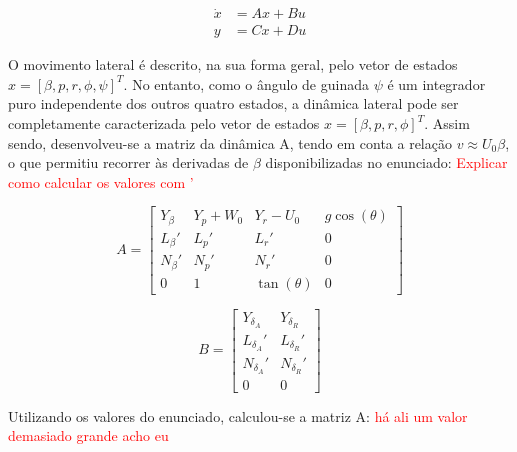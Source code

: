 \begin{align}
\dot{x} &= A x + B u \\
y &= C x + D u
\end{align}

\par O movimento lateral é descrito, na sua forma geral, pelo vetor de estados $x = [\beta, p, r, \phi, \psi]^T$. No entanto, como o ângulo de guinada $\psi$ é um integrador puro independente dos outros quatro estados, a dinâmica lateral pode ser completamente caracterizada pelo vetor de estados $x = [\beta, p, r, \phi]^T$. Assim sendo, desenvolveu-se a matriz da dinâmica A, tendo em conta a relação $v \approx U_0 \beta$, o que permitiu recorrer às derivadas de $\beta$ disponibilizadas no enunciado: \textcolor{red}{Explicar como calcular os valores com '}

\begin{equation}
A = \begin{bmatrix} Y_\beta & Y_p + W_0 & Y_r-U_0 & g\cos(\theta) \\ L_\beta' & L_p' & L_r' & 0 \\ N_\beta' & N_p' & N_r' & 0 \\ 0 & 1 & \tan(\theta) & 0\end{bmatrix} 
\end{equation}

\begin{equation}
B = \begin{bmatrix} Y_{\delta_A} & Y_{\delta_R} \\ L_{\delta_A}' & L_{\delta_R}'\\ N_{\delta_A}' & N_{\delta_R}'\\ 0 & 0\end{bmatrix}
\end{equation}

Utilizando os valores do enunciado, calculou-se a matriz A: \textcolor{red}{há ali um valor demasiado grande acho eu}

